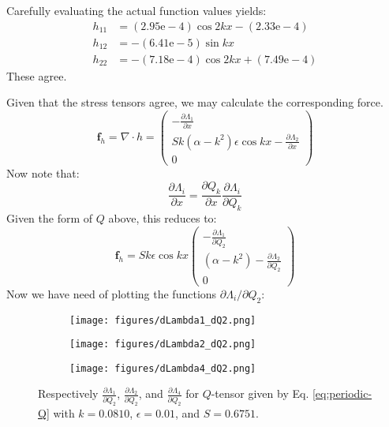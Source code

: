 \documentclass[reqno]{article}
\begin{document}
Carefully evaluating the actual function values yields:
\begin{align}
  h_{11} &= (2.95\text{e}-4)\cos 2kx - (2.33\text{e}-4) \\
  h_{12} &= -(6.41\text{e}-5) \sin kx \\
  h_{22} &= -(7.18\text{e}-4) \cos 2kx + (7.49\text{e}-4)
\end{align}
These agree.

Given that the stress tensors agree, we may calculate the corresponding force.
\begin{equation}
  \mathbf{f}_h
  =
  \nabla \cdot h
  =
  \begin{pmatrix}
    -\frac{\partial \Lambda_1}{\partial x} \\
    Sk \left( \alpha - k^2 \right) \epsilon \cos kx - \frac{\partial \Lambda_2}{\partial x} \\
    0
  \end{pmatrix}
\end{equation}
Now note that:
\begin{equation}
  \frac{\partial \Lambda_i}{\partial x}
  =
  \frac{\partial Q_k}{\partial x} \frac{\partial \Lambda_i}{\partial Q_k}
\end{equation}
Given the form of $Q$ above, this reduces to:
\begin{equation}
  \mathbf{f}_h
  =
  S k \epsilon \cos kx
  \begin{pmatrix}
    -\frac{\partial \Lambda_1}{\partial Q_2} \\
    (\alpha - k^2) - \frac{\partial \Lambda_2}{\partial Q_2} \\
    0
  \end{pmatrix}
\end{equation}
Now we have need of plotting the functions $\partial \Lambda_i / \partial Q_2$:
\begin{figure}[H] 
  \centering
  \begin{subfigure}{0.45\textwidth}
    \texttt{[image: figures/dLambda1\_dQ2.png]}
    \caption{}
    \label{fig:dLambda1-dQ2}
  \end{subfigure}
  \hfill
  \begin{subfigure}{0.45\textwidth}
    \texttt{[image: figures/dLambda2\_dQ2.png]}
    \caption{}
    \label{fig:dLambda2-dQ2}
  \end{subfigure}
  \hfill
  \begin{subfigure}{0.45\textwidth}
    \texttt{[image: figures/dLambda4\_dQ2.png]}
    \caption{}
    \label{fig:dLambda4-dQ2}
  \end{subfigure}
  \caption{Respectively $\frac{\partial \Lambda_1}{\partial Q_2}$,
    $\frac{\partial \Lambda_2}{\partial Q_2}$, and
    $\frac{\partial \Lambda_4}{\partial Q_2}$ for $Q$-tensor given by Eq. \eqref{eq:periodic-Q}
    with $k = 0.0810$, $\epsilon = 0.01$, and $S = 0.6751$.}
  \label{fig:Lambda_i}
\end{figure}
\end{document}
